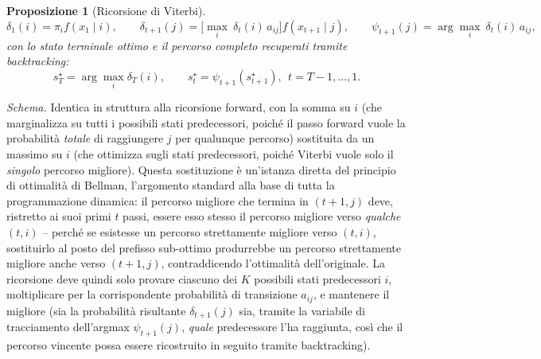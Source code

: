 \documentclass[11pt]{article}
\newtheorem{proposition}[theorem]{Proposizione}
\theoremstyle{definition}
\theoremstyle{remark}
\begin{document}
\begin{proposition}[Ricorsione di Viterbi]
\[
\delta_1(i)=\pi_if(x_1\mid i), \qquad
\delta_{t+1}(j) = \Big[\max_{i}\ \delta_t(i)\,a_{ij}\Big]f(x_{t+1}\mid j), \qquad
\psi_{t+1}(j) = \arg\max_i\ \delta_t(i)\,a_{ij},
\]
con lo stato terminale ottimo e il percorso completo recuperati tramite backtracking:
\[
s_T^{\star}=\arg\max_i\delta_T(i), \qquad s_t^{\star}=\psi_{t+1}(s_{t+1}^{\star}),\ \ t=T-1,\dots,1.
\]
\end{proposition}
\emph{Schema.} Identica in struttura alla ricorsione forward, con la somma su $i$ (che marginalizza su tutti i possibili stati predecessori, poich\'e il passo forward vuole la probabilit\`a \emph{totale} di raggiungere $j$ per qualunque percorso) sostituita da un massimo su $i$ (che ottimizza sugli stati predecessori, poich\'e Viterbi vuole solo il \emph{singolo} percorso migliore). Questa sostituzione \`e un'istanza diretta del principio di ottimalit\`a di Bellman, l'argomento standard alla base di tutta la programmazione dinamica: il percorso migliore che termina in $(t+1,j)$ deve, ristretto ai suoi primi $t$ passi, essere esso stesso il percorso migliore verso \emph{qualche} $(t,i)$ -- perch\'e se esistesse un percorso strettamente migliore verso $(t,i)$, sostituirlo al posto del prefisso sub-ottimo produrrebbe un percorso strettamente migliore anche verso $(t+1,j)$, contraddicendo l'ottimalit\`a dell'originale. La ricorsione deve quindi solo provare ciascuno dei $K$ possibili stati predecessori $i$, moltiplicare per la corrispondente probabilit\`a di transizione $a_{ij}$, e mantenere il migliore (sia la probabilit\`a risultante $\delta_{t+1}(j)$ sia, tramite la variabile di tracciamento dell'argmax $\psi_{t+1}(j)$, \emph{quale} predecessore l'ha raggiunta, cos\`i che il percorso vincente possa essere ricostruito in seguito tramite backtracking).
\end{document}

